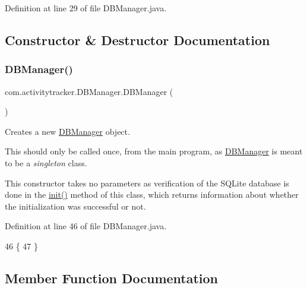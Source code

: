 Definition at line 29 of file D\+B\+Manager.\+java.



\subsection{Constructor \& Destructor Documentation}
\mbox{\label{classcom_1_1activitytracker_1_1_d_b_manager_ac1f558ef56fe02d74fe103a473a15bb5}} 
\subsubsection{\texorpdfstring{D\+B\+Manager()}{DBManager()}}
{\footnotesize\ttfamily com.\+activitytracker.\+D\+B\+Manager.\+D\+B\+Manager (\begin{DoxyParamCaption}{ }\end{DoxyParamCaption})\hspace{0.3cm}{\ttfamily [package]}}

Creates a new \mbox{\hyperlink{classcom_1_1activitytracker_1_1_d_b_manager}{D\+B\+Manager}} object.

This should only be called once, from the main program, as \mbox{\hyperlink{classcom_1_1activitytracker_1_1_d_b_manager}{D\+B\+Manager}} is meant to be a {\itshape singleton} class.

This constructor takes no parameters as verification of the S\+Q\+Lite database is done in the \mbox{\hyperlink{classcom_1_1activitytracker_1_1_d_b_manager_a41df4600bb5901a26a4ea6a7108a70b9}{init()}} method of this class, which returns information about whether the initialization was successful or not. 

Definition at line 46 of file D\+B\+Manager.\+java.


\begin{DoxyCode}
46                 \{
47     \}
\end{DoxyCode}


\subsection{Member Function Documentation}
\mbox{\label{classcom_1_1activitytracker_1_1_d_b_manager_a39ef296348c7bfacf965b3417655f4e5}} 
